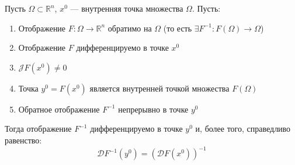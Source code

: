 \documentclass[11pt]{article}
\begin{document}
\begin{theorem}
    Пусть $\Omega \subset \mathbb{R}^n$, $x^0$ --- внутренняя точка множества $\Omega$.
    Пусть:
    \begin{enumerate}
        \item Отображение $F \colon \Omega \to \mathbb{R}^n$ обратимо на $\Omega$ (то есть $\exists F^{-1} \colon F(\Omega) \to \Omega$)
        \item Отображение $F$ дифференцируемо в точке $x^0$
        \item $\mathcal{J} F\left(x^0\right) \neq 0$
        \item Точка $y^0 = F\left(x^0\right)$ является внутренней точкой множества $F(\Omega)$
        \item Обратное отображение $F^{-1}$ непрерывно в точке $y^0$
    \end{enumerate}
    Тогда отображение $F^{-1}$ дифференцируемо в точке $y^0$ и, более того, справедливо равенство:
    \[\mathcal{D} F^{-1} \left(y^0\right) = \left(\mathcal{D} F \left(x^0\right) \right)^{-1}\]
\end{theorem}
\end{document}
